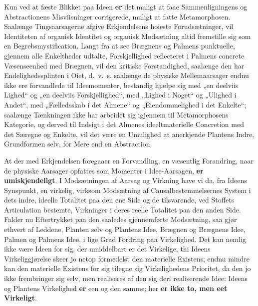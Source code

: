 \documentclass[11pt]{book}
\newcommand{\opage}[1]{\marginnote{\footnotesize\textit{[#1]}}}
\begin{document}
Kun ved at fæste Blikket paa Ideen \textbf{er} det muligt at faae
Sammenligningens og Abstractionens Misviisninger corrigerede, muligt at
fatte Metamorphosen. Saalænge Tingsaarsagerne afgive Erkjendelsens hoieste
Forudsætninger, vil Identiteten af organisk Identitet og organisk
Modsætning altid fremstille sig som en Begrebsmystification.
Langt fra at see Brægnens og Palmens punktuelle, gjennem alle Enkeltheder
udtalte, Forskjellighed reflecteret i Palmens concrete Væsenseenhed med
Brægnen, vil den kritiske Forstandighed, saalænge den har
Endelighedssplinten i Oiet, d.~v.~s. saalænge de physiske Mellemaarsager
endnu ikke ere forvandlede til Ideemomenter, bestandig hjælpe sig med „en
deelviis Lighed“ og „en deelviis Forskjellighed“, med „Lighed i Noget“ og
„Ulighed i Andet“, med „Fælledsskab i det Almene“ og
\opage{312} \setcounter{footnote}{0}%
„Eiendommelighed i det Enkelte“; saalænge Tænkningen ikke har arbeidet sig
igjennem til Metamorphosens Kategorie, og derved til Indsigt i det Almenes
ideeltmaterielle Concretion med det Særegne og Enkelte, vil det være en
Umulighed at anerkjende Plantens Indre, Grundformen selv, for Mere end en
Abstraction.

At der med Erkjendelsen foregaaer en Forvandling, en væsentlig Forandring,
naar de physiske Aarsager opfattes som Momenter i Idee-Aarsagen,
\textbf{er umiskjendeligt}. I Modsætningen af Aarsag og Virkning have vi da,
fra Ideens Synspunkt, en virkelig, virksom Modsætning af
Causalbestemmelsernes System i dets indre, ideelle Totalitet paa den ene
Side og de tilsvarende, ved Stoffets Articulation bestemte, Virkninger i
deres reelle Totalitet paa den anden Side. Falder nu Eftertrykket paa den
saaledes gjennemførte Modsætning, saa gjør ethvert af Leddene, Planten selv
og Plantens Idee, Brægnen og Brægnens Idee, Palmen og Palmens Idee, i lige
Grad Fordring paa Virkelighed. Det kan nemlig ikke være Ideen for sig, der
umiddelbart er det Virkelige, thi Ideens Virkeliggjørelse skeer jo netop
formedelst den materielle Existens; endnu mindre kan den materielle Existens
for sig tilegne sig Virkelighedens Prioritet, da den jo ikke frembringer sig
selv, men realiseres af den sig deri realiserende Idee: Ideens og Plantens
Virkelighed \textbf{er} een og den samme; her \textbf{er ikke to, men eet
Virkeligt}.
\end{document}
